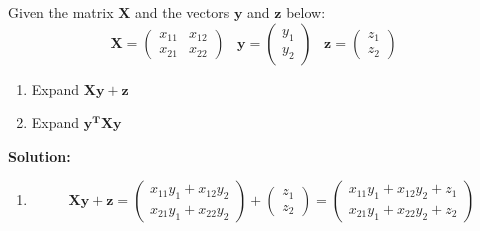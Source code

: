 \documentclass{harvardml}
\theoremstyle{definition}
\theoremstyle{plain}
\begin{document}
\begin{problem}
		    Given the matrix $\mathbf{X}$ and the vectors $\mathbf{y}$ and $\mathbf{z}$  below:
		    \begin{equation}
		        \mathbf{X} = \begin{pmatrix}
		        x_{11} & x_{12}\\
		        x_{21} & x_{22}
		        \end{pmatrix} \hspace{10pt} \mathbf{y} = \begin{pmatrix} y_{1} \\ y_{2} \end{pmatrix} \hspace{10pt} \mathbf{z} = \begin{pmatrix} z_{1} \\ z_{2} \end{pmatrix} \hspace{10pt} 
		    \end{equation}  
		    \begin{enumerate}[label=(\alph*)]
		        \item Expand $\mathbf{X}\mathbf{y} + \mathbf{z}$ 
		        
		        \item Expand $\mathbf{y^T}\mathbf{X}\mathbf{y}$

		    \end{enumerate}
		\textbf{Solution:} 
		\begin{enumerate}[label=(\alph*)]
		        \item 
		        \begin{equation}
		        \mathbf{X y + z} = \begin{pmatrix}
		                        x_{11}y_{1} + x_{12}y_{2} \\
		                        x_{21}y_{1} + x_{22}y_{2}
		                        \end{pmatrix} +  \begin{pmatrix}
		                        z_1 \\
		                        z_2
		                        \end{pmatrix} = \begin{pmatrix}
		                        x_{11}y_{1} + x_{12}y_{2} + z_1 \\
		                        x_{21}y_{1} + x_{22}y_{2} + z_2
		                        \end{pmatrix} \nonumber
		        \end{equation}
		        

\end{enumerate}
\end{problem}
\end{document}
